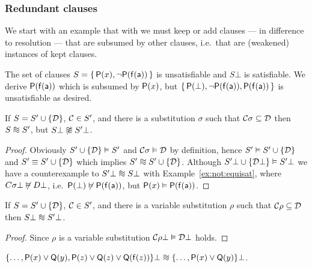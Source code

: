 \subsubsection{Redundant clauses}

We start with an example that
with \InstGen{} we must keep or add clauses
--- in difference to resolution --- that are subsumed by other clauses,
i.e.\ that are (weakened) instances of kept clauses.

\begin{example}\label{ex:not:equisat}
	The set of clauses \( S = \{ \,
	\mathsf{P}(x), \lnot\mathsf{P}(\mathsf{f}(\mathsf{a}))
	\, \} \) is unsatisfiable and
	\( S\bot \) is satisfiable.
	We derive \( \mathsf{P}(\mathsf{f}(\mathsf{a})) \) which is subsumed by \( \mathsf{P}(x) \),
	but \( \{ \,
	\mathsf{P}(\bot), \lnot\mathsf{P}(\mathsf{f}(\mathsf{a})), \mathsf{P}(\mathsf{f}(\mathsf{a}))
	\, \} \) is unsatisfiable as desired.
\end{example}

\begin{lemma}
	If \( S = S' \cup \{ \mathcal{D} \} \),
	\( \mathcal{C} \in S' \), and there is a substitution \( \sigma \)
	such that \( \mathcal{C}\sigma \subseteq \mathcal{D} \)
	then
	\( S  \equisat S' \),
	but \( S\bot  \not\equisat S'\bot \).
\end{lemma}
\begin{proof}
	Obviously \( S'\cup \{ \mathcal{D} \} \vDash S' \) and
	\( \mathcal{C}\sigma\vDash\mathcal{D} \) by definition, hence
	\( S' \vDash S'\cup \{ \mathcal{D} \} \) and
	\( S' \equiv S'\cup \{ \mathcal{D} \} \) which implies
	\( S' \equisat S' \cup \{ \mcD \} \).
%
	Although \( S'\bot\cup \{ \mathcal{D}\bot \} \vDash S'\bot \)
	we have a counterexample to
	\( S'\bot \equisat S\bot \) with Example~\ref{ex:not:equisat},
	where \( C\sigma\bot \not\vDash D\bot \),
	i.e.~\( \mathsf{P}(\bot)\not\vDash\mathsf{P}(\mathsf{f}(\mathsf{a})) \), but \( \mathsf{P}(x)\vDash\mathsf{P}(\mathsf{f}(\mathsf{a}))  \).
\end{proof}
\begin{lemma}
	If \( S = S' \cup \{ \mathcal{D} \} \),
	\( \mathcal{C} \in S' \), and there is a variable substitution \( \rho \)
	such that \( \mathcal{C}\rho \subseteq \mathcal{D} \)
	then
	\( S\bot\equisat S'\bot \).
\end{lemma}
\begin{proof}
	Since \( \rho \) is a variable substitution
	\( \mathcal{C}\rho\bot \vDash \mathcal{D}\bot \) holds.
\end{proof}

\begin{example}
	\(
		\{ \ldots,
		\mP(x)\lor \mQ(y), \mP(z)\lor\mQ(z) \lor \mQ(\mf(z)) \}\bot
		\equisat
		\{ \ldots, \mP(x) \lor \mQ(y) \}\bot
	\).
\end{example}

